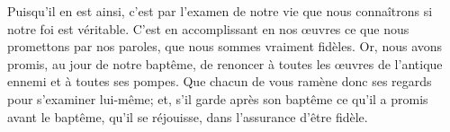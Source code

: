 Puisqu’il en est ainsi,
	c’est par l’examen de notre vie
	que nous connaîtrons si notre foi est véritable.
C’est en accomplissant en nos œuvres ce que nous promettons par nos paroles,
	que nous sommes vraiment fidèles.
Or, nous avons promis, au jour de notre baptême,
	de renoncer à toutes les œuvres de l’antique ennemi
	et à toutes ses pompes.
Que chacun de vous ramène donc ses regards pour s’examiner lui-même;
	et, s’il garde après son baptême ce qu’il a promis avant le baptême,
	qu’il se réjouisse, dans l’assurance d’être fidèle.
